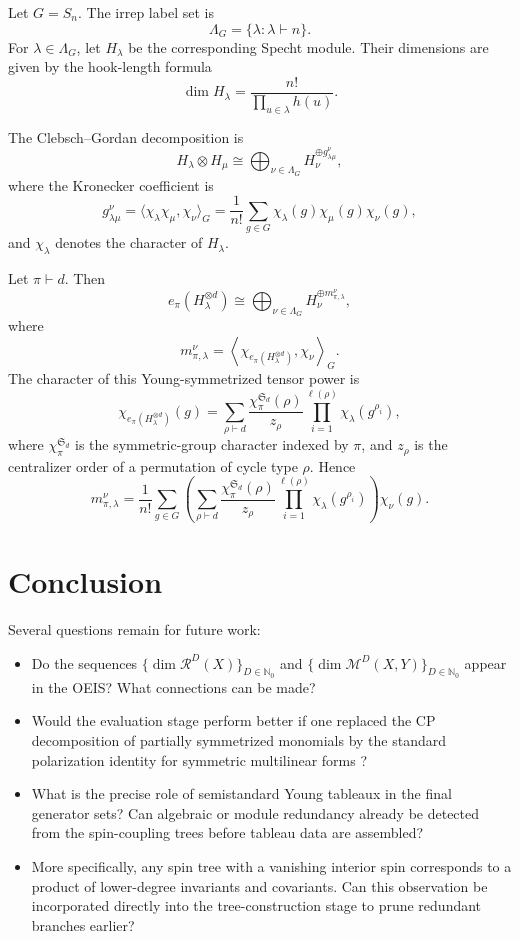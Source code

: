 \documentclass[11pt]{article}
\newcommand{\dsN}{\mathbb{N}}
\newcommand{\scM}{\mathcal{M}}
\newcommand{\scR}{\mathcal{R}}
\theoremstyle{definition}
\begin{document}
Let $G = S_n$.  The irrep label set is
\[
  \Lambda_G=\{\lambda:\lambda\vdash n\}.
\]
For $\lambda\in\Lambda_G$, let $H_\lambda$ be the corresponding Specht module.
Their dimensions are given by the hook-length formula
\[
  \dim H_\lambda
  =
  \frac{n!}{\prod_{u\in\lambda} h(u)}.
\]

The Clebsch--Gordan decomposition is
\[
  H_\lambda\otimes H_\mu
  \cong
  \bigoplus_{\nu\in\Lambda_G}
  H_\nu^{\oplus g_{\lambda\mu}^{\nu}},
\]
where the Kronecker coefficient is
\[
  g_{\lambda\mu}^{\nu}
  =
  \langle \chi_\lambda\chi_\mu,\chi_\nu\rangle_G
  =
  \frac{1}{n!}
  \sum_{g\in G}
  \chi_\lambda(g)\chi_\mu(g)\chi_\nu(g),
\]
and $\chi_\lambda$ denotes the character of $H_\lambda$.

Let $\pi\vdash d$. Then
\[
  e_\pi(H_\lambda^{\otimes d})
  \cong
  \bigoplus_{\nu\in\Lambda_G}
  H_\nu^{\oplus m_{\pi,\lambda}^{\nu}},
\]
where
\[
  m_{\pi,\lambda}^{\nu}
  =
  \left\langle
  \chi_{e_\pi(H_\lambda^{\otimes d})},
  \chi_\nu
  \right\rangle_G.
\]
The character of this Young-symmetrized tensor power is
\[
  \chi_{e_\pi(H_\lambda^{\otimes d})}(g)
  =
  \sum_{\rho\vdash d}
  \frac{\chi_{\pi}^{\mathfrak S_d}(\rho)}{z_\rho}
  \prod_{i=1}^{\ell(\rho)}
  \chi_\lambda(g^{\rho_i}),
\]
where $\chi_{\pi}^{\mathfrak S_d}$ is the symmetric-group character indexed by $\pi$, and $z_\rho$ is the centralizer order of a permutation of cycle type $\rho$. Hence
\[
  m_{\pi,\lambda}^{\nu}
  =
  \frac{1}{n!}
  \sum_{g\in G}
  \left(
  \sum_{\rho\vdash d}
  \frac{\chi_{\pi}^{\mathfrak S_d}(\rho)}{z_\rho}
  \prod_{i=1}^{\ell(\rho)}
  \chi_\lambda(g^{\rho_i})
  \right)
  \chi_\nu(g).
\]

\section{Conclusion}\label{sec:conclusion}

Several questions remain for future work:
\begin{itemize}[leftmargin=2em]
  \item Do the sequences $\{\dim \scR^D(X)\}_{D \in \dsN_0}$ and $\{\dim \scM^D(X,Y)\}_{D \in \dsN_0}$ appear in the OEIS? What connections can be made?
  \item Would the evaluation stage perform better if one replaced the CP decomposition of partially symmetrized monomials by the standard polarization identity for symmetric multilinear forms \cite[Theorem~1 and Eq.~(7)]{Thomas2014}?
  \item What is the precise role of semistandard Young tableaux in the final generator sets? Can algebraic or module redundancy already be detected from the spin-coupling trees before tableau data are assembled?
  \item More specifically, any spin tree with a vanishing interior spin corresponds to a product of lower-degree invariants and covariants. Can this observation be incorporated directly into the tree-construction stage to prune redundant branches earlier?
\end{itemize}
\end{document}
